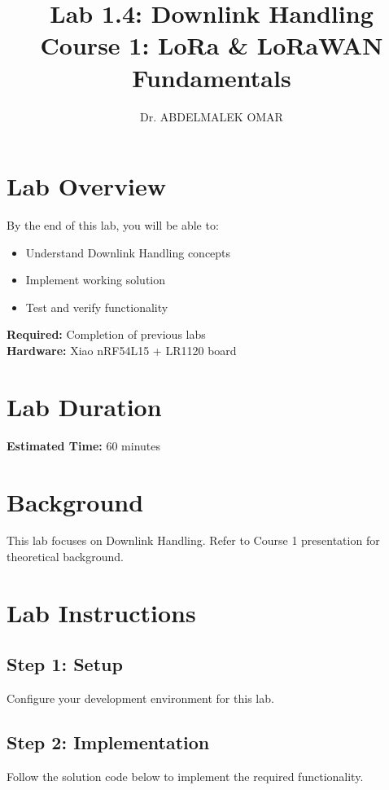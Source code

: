 \documentclass[11pt,a4paper]{article}
\title{\textbf{Lab 1.4: Downlink Handling}\\
\large Course 1: LoRa & LoRaWAN Fundamentals}
\author{Dr. ABDELMALEK OMAR}
\date{}
\begin{document}
\maketitle
\thispagestyle{fancy}

\section{Lab Overview}

\begin{objectivebox}
By the end of this lab, you will be able to:
\begin{itemize}
    \item Understand Downlink Handling concepts
    \item Implement working solution
    \item Test and verify functionality
\end{itemize}
\end{objectivebox}

\begin{prereqbox}
\textbf{Required:} Completion of previous labs\\
\textbf{Hardware:} Xiao nRF54L15 + LR1120 board
\end{prereqbox}

\section{Lab Duration}
\textbf{Estimated Time:} 60 minutes

\section{Background}

This lab focuses on Downlink Handling. Refer to Course 1 presentation for theoretical background.

\section{Lab Instructions}

\subsection{Step 1: Setup}
Configure your development environment for this lab.

\subsection{Step 2: Implementation}
Follow the solution code below to implement the required functionality.
\end{document}
